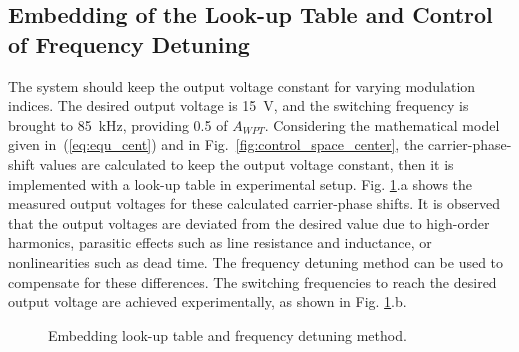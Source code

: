\documentclass[journal]{IEEEtran}
\begin{document}
\vspace*{-6mm}
\subsection{Embedding of the Look-up Table and Control of Frequency Detuning}
The system should keep the output voltage constant for varying modulation indices. 
The desired output voltage is 15~V, and the switching frequency is brought to 85~kHz, providing 0.5 of $A_{WPT}$. 
Considering the mathematical model given in~(\ref{eq:equ_cent}) and in Fig.~\ref{fig:control_space_center}, the carrier-phase-shift values are calculated to keep the output voltage constant, then it is implemented with a look-up table in experimental setup. 
Fig. \ref{fig:look_up_table_exp}.a shows the measured output voltages for these calculated carrier-phase shifts. 
It is observed that the output voltages are deviated from the desired value due to high-order harmonics, parasitic effects such as line resistance and inductance, or nonlinearities such as dead time. 
The frequency detuning method can be used to compensate for these differences. 
The switching frequencies to reach the desired output voltage are achieved experimentally, as shown in Fig. \ref{fig:look_up_table_exp}.b.
\vspace*{-2mm}
\begin{figure}[h!]
\centering
{}
\caption{Embedding look-up table and frequency detuning method.} 
    \label{fig:look_up_table_exp}
\end{figure}
\end{document}

